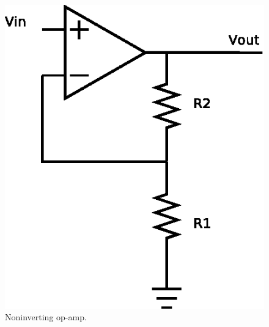 \documentclass[11pt,onecolumn]{article}
\begin{document}
\begin{figure}
\includegraphics{Diagram2.eps}
\caption{Noninverting op-amp.}\label{fig:noninverting_data}
\end{figure}


\end{document}
